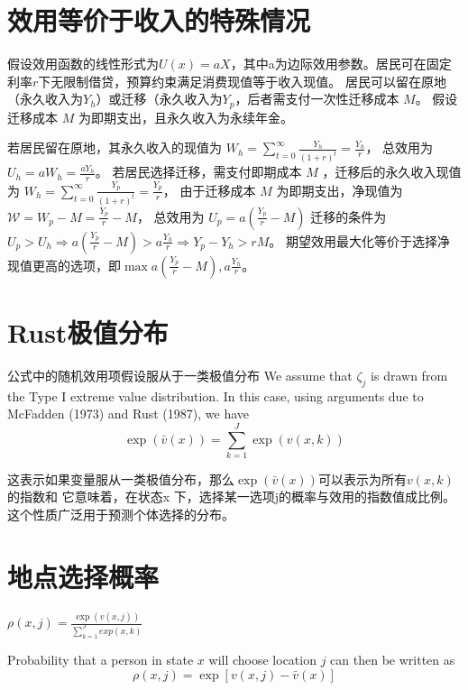 \documentclass[a4paper,12pt,oneside]{book} %
\begin{document}
\chapter{效用等价于收入的特殊情况}
假设效用函数的线性形式为$U(x)=a X$，其中a为边际效用参数。居民可在固定利率$r$下无限制借贷，预算约束满足消费现值等于收入现值。
居民可以留在原地（永久收入为$Y_h$）或迁移（永久收入为$Y_p$，后者需支付一次性迁移成本 $M$。
假设迁移成本 
$M$
为即期支出，且永久收入为永续年金。

若居民留在原地，其永久收入的现值为
$W_h = \sum\limits_{t=0}^\infty \frac{Y_h}{(1+r)^t}=\frac{Y_h}{r}$，
总效用为$U_h=a W_h = \frac{a Y_h}{r}$。
若居民选择迁移，需支付即期成本 
$M$
，迁移后的永久收入现值为
$W_h = \sum\limits_{t=0}^\infty \frac{Y_p}{(1+r)^t}=\frac{Y_p}{r}$，
由于迁移成本 
$M$
为即期支出，净现值为
$\mathcal{W}=W_p-M=\frac{Y_p}{r}-M$，
总效用为
$U_p=a(\frac{Y_p}{r}-M)$
迁移的条件为$U_p>U_h \Rightarrow a(\frac{Y_p}{r}-M) > a \frac{ Y_h}{r} \Rightarrow Y_p-Y_h > rM$。
期望效用最大化等价于选择净现值更高的选项，即$\max{a(\frac{Y_p}{r}-M), a \frac{ Y_h}{r}}$。

\chapter{Rust极值分布}
公式中的随机效用项假设服从于一类极值分布
We assume that $\zeta_j$ is drawn from the Type I extreme value distribution. In this case, using arguments due to McFadden (1973) and Rust (1987), we have
$$\exp\left(\bar{v}(x)\right) = \sum_{k=1}^J \exp\left(v(x, k)\right)$$

这表示如果变量服从一类极值分布，那么$\exp\left(\bar{v}(x)\right)$可以表示为所有$v(x, k)$的指数和
它意味着，在状态x 下，选择某一选项j的概率与效用的指数值成比例。
这个性质广泛用于预测个体选择的分布。

\chapter{地点选择概率}
$\rho(x,j)=\frac{\exp(v(x,j))}{\sum\limits_{k=1}^{J} exp(x,k)}$

Probability that a person in state $x$ will choose location $j$ can then be written as
$$\rho(x,j)=\exp[v(x,j)-\bar v(x)]$$



\newpage


\end{document}
